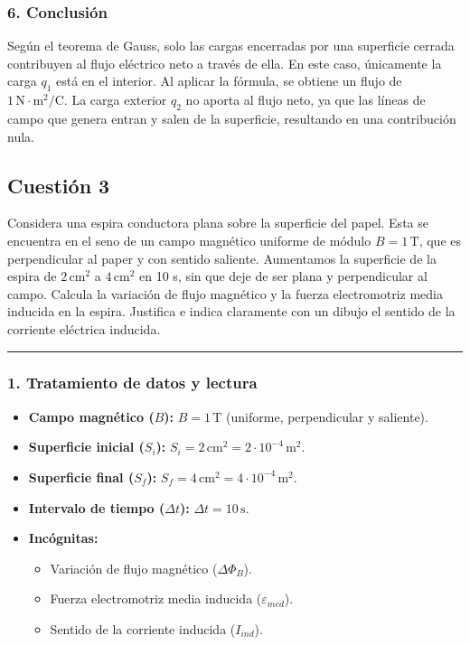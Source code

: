 \subsubsection*{6. Conclusión}
\begin{cajaconclusion}
Según el teorema de Gauss, solo las cargas encerradas por una superficie cerrada contribuyen al flujo eléctrico neto a través de ella. En este caso, únicamente la carga $q_1$ está en el interior. Al aplicar la fórmula, se obtiene un flujo de $1 \, \text{N}\cdot\text{m}^2/\text{C}$. La carga exterior $q_2$ no aporta al flujo neto, ya que las líneas de campo que genera entran y salen de la superficie, resultando en una contribución nula.
\end{cajaconclusion}

\newpage

\subsection{Cuestión 3}
\label{subsec:C3_2021_jun_ord}

\begin{cajaenunciado}
Considera una espira conductora plana sobre la superficie del papel. Esta se encuentra en el seno de un campo magnético uniforme de módulo $B=1\,\text{T}$, que es perpendicular al paper y con sentido saliente. Aumentamos la superficie de la espira de $2\,\text{cm}^2$ a $4\,\text{cm}^2$ en 10 s, sin que deje de ser plana y perpendicular al campo. Calcula la variación de flujo magnético y la fuerza electromotriz media inducida en la espira. Justifica e indica claramente con un dibujo el sentido de la corriente eléctrica inducida.
\end{cajaenunciado}
\hrule

\subsubsection*{1. Tratamiento de datos y lectura}
\begin{itemize}
    \item \textbf{Campo magnético ($B$):} $B = 1 \, \text{T}$ (uniforme, perpendicular y saliente).
    \item \textbf{Superficie inicial ($S_i$):} $S_i = 2 \, \text{cm}^2 = 2 \cdot 10^{-4} \, \text{m}^2$.
    \item \textbf{Superficie final ($S_f$):} $S_f = 4 \, \text{cm}^2 = 4 \cdot 10^{-4} \, \text{m}^2$.
    \item \textbf{Intervalo de tiempo ($\Delta t$):} $\Delta t = 10 \, \text{s}$.
    \item \textbf{Incógnitas:}
    \begin{itemize}
        \item Variación de flujo magnético ($\Delta \Phi_B$).
        \item Fuerza electromotriz media inducida ($\varepsilon_{med}$).
        \item Sentido de la corriente inducida ($I_{ind}$).
    \end{itemize}
\end{itemize}

